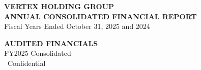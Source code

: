 \documentclass[10pt,letterpaper]{article}
\begin{document}
\thispagestyle{empty}

\begin{tcolorbox}[
    colback=primary,
    colframe=primary,
    arc=0pt,
    left=15pt, right=15pt, top=15pt, bottom=15pt
]
  \color{white}
  \begin{minipage}[c]{0.65\textwidth}
    {\Huge\bfseries VERTEX HOLDING GROUP} \\[5pt]
    {\large\bfseries ANNUAL CONSOLIDATED FINANCIAL REPORT} \\
    \small Fiscal Years Ended October 31, 2025 and 2024
  \end{minipage}\hfill
  \begin{minipage}[c]{0.3\textwidth}
    \raggedleft
    \color{accent}
    \textbf{AUDITED FINANCIALS} \\
    \color{white}\small FY2025 Consolidated \\
    \faLock\ Confidential
  \end{minipage}
\end{tcolorbox}

\vspace{15pt}








\end{document}
